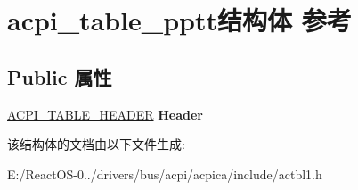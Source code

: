 \hypertarget{structacpi__table__pptt}{}\section{acpi\+\_\+table\+\_\+pptt结构体 参考}
\label{structacpi__table__pptt}
\subsection*{Public 属性}
\begin{DoxyCompactItemize}
\item 
\mbox{\label{structacpi__table__pptt_afa8284a61e97436473c826029b020c03}} 
\hyperlink{structacpi__table__header}{A\+C\+P\+I\+\_\+\+T\+A\+B\+L\+E\+\_\+\+H\+E\+A\+D\+ER} {\bfseries Header}
\end{DoxyCompactItemize}


该结构体的文档由以下文件生成\+:\begin{DoxyCompactItemize}
\item 
E\+:/\+React\+O\+S-\/0../drivers/bus/acpi/acpica/include/actbl1.\+h\end{DoxyCompactItemize}
